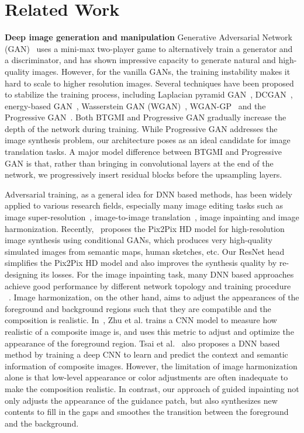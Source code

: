 \section{Related Work}

\noindent\textbf{Deep image generation and manipulation} Generative Adversarial Network (GAN)~\cite{goodfellow2014generative} uses a mini-max two-player game to alternatively train a generator and a discriminator, and has shown impressive capacity to generate natural and high-quality images. However, for the vanilla GANs, the training instability makes it hard to scale to higher resolution images. Several techniques have been proposed to stabilize the training process, including Laplacian pyramid GAN~\cite{denton2015deep}, DCGAN~\cite{radford2015unsupervised}, energy-based GAN~\cite{zhao2016energy}, Wasserstein GAN (WGAN)~\cite{arjovsky2017wasserstein}, WGAN-GP~\cite{gulrajani2017improved} and the Progressive GAN~\cite{karras2017progressive}. Both BTGMI and Progressive GAN gradually increase the depth of the network during training. While Progressive GAN addresses the image synthesis problem, our architecture poses as an ideal candidate for image translation tasks. A major model difference between BTGMI and Progressive GAN is that, rather than bringing in convolutional layers at the end of the network, we progressively insert residual blocks before the upsampling layers. 

Adversarial training, as a general idea for DNN based methods, has been widely applied to various research fields, especially many image editing tasks such as image super-resolution~\cite{kim2016accurate,dong2014learning,ledig2016photo}, image-to-image translation~\cite{isola2016image,zhu2017unpaired}, image inpainting and image harmonization. Recently,~\cite{wang2017high} proposes the Pix2Pix HD model for high-resolution image synthesis using conditional GANs, which produces very high-quality simulated images from semantic maps, human sketches, etc. Our ResNet head simplifies the Pix2Pix HD model and also improves the synthesis quality by re-designing its losses. For the image inpainting task, many DNN based approaches achieve good performance by different network topology and training procedure ~\cite{pathak2016context,yang2017high,yeh2016semantic,iizuka2017globally}. Image harmonization, on the other hand, aims to adjust the appearances of the foreground and background regions such that they are compatible and the composition is realistic. In~\cite{zhu2015learning}, Zhu et al. trains a CNN model to measure how realistic of a composite image is, and uses this metric to adjust and optimize the appearance of the foreground region. Tsai et al.~\cite{tsai2017deep} also proposes a DNN based method by training a deep CNN to learn and predict the context and semantic information of composite images. However, the limitation of image harmonization alone is that low-level appearance or color adjustments are often inadequate to make the composition realistic. In contrast, our approach of guided inpainting not only adjusts the appearance of the guidance patch, but also synthesizes new contents to fill in the gaps and smoothes the transition between the foreground and the background.

